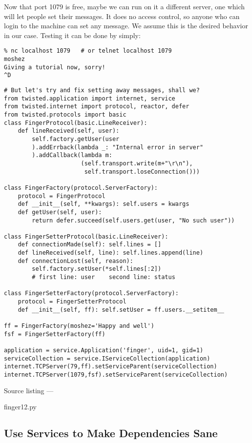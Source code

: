 Now that port 1079 is free, maybe we can run on it a different server, one which will let people set their messages. It does no access control, so anyone who can login to the machine can set any message. We assume this is the desired behavior in our case. Testing it can be done by simply: \begin{verbatim}
% nc localhost 1079   # or telnet localhost 1079
moshez
Giving a tutorial now, sorry!
^D
\end{verbatim}
\begin{verbatim}
# But let's try and fix setting away messages, shall we?
from twisted.application import internet, service
from twisted.internet import protocol, reactor, defer
from twisted.protocols import basic
class FingerProtocol(basic.LineReceiver):
    def lineReceived(self, user):
        self.factory.getUser(user
        ).addErrback(lambda _: "Internal error in server"
        ).addCallback(lambda m:
                      (self.transport.write(m+"\r\n"),
                       self.transport.loseConnection()))

class FingerFactory(protocol.ServerFactory):
    protocol = FingerProtocol
    def __init__(self, **kwargs): self.users = kwargs
    def getUser(self, user):
        return defer.succeed(self.users.get(user, "No such user"))

class FingerSetterProtocol(basic.LineReceiver):
    def connectionMade(self): self.lines = []
    def lineReceived(self, line): self.lines.append(line)
    def connectionLost(self, reason):
        self.factory.setUser(*self.lines[:2])
        # first line: user    second line: status

class FingerSetterFactory(protocol.ServerFactory):
    protocol = FingerSetterProtocol
    def __init__(self, ff): self.setUser = ff.users.__setitem__

ff = FingerFactory(moshez='Happy and well')
fsf = FingerSetterFactory(ff)

application = service.Application('finger', uid=1, gid=1)
serviceCollection = service.IServiceCollection(application)
internet.TCPServer(79,ff).setServiceParent(serviceCollection)
internet.TCPServer(1079,fsf).setServiceParent(serviceCollection)
\end{verbatim}\parbox[b]{\linewidth}{\begin{center}Source listing --- \begin{em}finger12.py\end{em}\end{center}}

\subsection{Use Services to Make Dependencies Sane}


